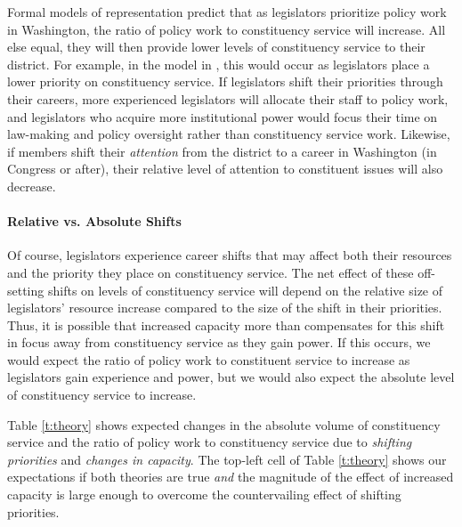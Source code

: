 \documentclass[12pt]{article}
\begin{document}
Formal models of representation predict that as legislators prioritize policy work in Washington, the ratio of policy work to constituency service will increase. All else equal, they will then provide lower levels of constituency service to their district. For example, in the model in \cite{AshworthBuenodeMesquita2006}, this would occur as legislators place a lower priority on constituency service. If legislators shift their priorities through their careers, more experienced legislators will allocate their staff to policy work, and legislators who acquire more institutional power would focus their time on law-making and policy oversight rather than constituency service work. Likewise, if members shift their \textit{attention} from the district to a career in Washington (in Congress or after), their relative level of attention to constituent issues will also decrease. 


\paragraph{Relative vs. Absolute Shifts} Of course, legislators experience career shifts that may affect both their resources and the priority they place on constituency service. The net effect of these off-setting shifts on levels of constituency service will depend on the relative size of legislators' resource increase compared to the size of the shift in their priorities. Thus, it is possible that increased capacity more than compensates for this shift in focus away from constituency service as they gain power.
If this occurs, we would expect the ratio of policy work to constituent service to increase as legislators gain experience and power, but we would also expect the absolute level of constituency service to increase.


Table \ref{t:theory} shows expected changes in the absolute volume of constituency service and the ratio of policy work to constituency service due to \textit{shifting priorities} and \textit{changes in capacity}. The top-left cell of Table \ref{t:theory} shows our expectations if both theories are true \textit{and} the magnitude of the effect of increased capacity is large enough to overcome the countervailing effect of shifting priorities.
\end{document}
